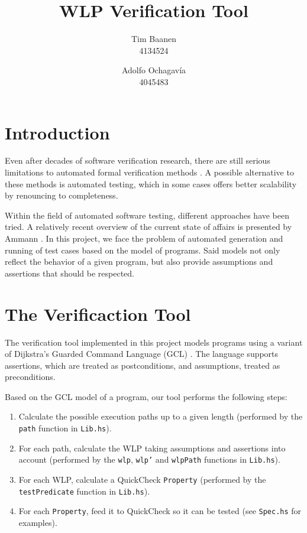 \documentclass[a4paper]{article}
\author{
  Tim Baanen\\4134524
  \and
  Adolfo Ochagavía\\4045483
}
\title{WLP Verification Tool}
\begin{document}
\maketitle

\section{Introduction}

Even after decades of software verification research, there are still serious
limitations to automated formal verification methods \cite{d2008survey}. A
possible alternative to these methods is automated testing, which in some cases
offers better scalability by renouncing to completeness.

Within the field of automated software testing, different approaches have been
tried. A relatively recent overview of the current state of affairs is
presented by Ammann \cite{ammann2008introduction}. In this project, we face
the problem of automated generation and running of test cases based on the
model of programs. Said models not only reflect the behavior of a given
program, but also provide assumptions and assertions that should be respected.


\section{The Verificaction Tool}

The verification tool implemented in this project models programs using a
variant of Dijkstra's Guarded Command Language (GCL) \cite{Dijkstra:gcl}.
The language supports assertions, which are treated as postconditions,
and assumptions, treated as preconditions.

Based on the GCL model of a program, our tool performs the following steps:

\begin{enumerate}
\item Calculate the possible execution paths up to a given length (performed by
the \texttt{path} function in \texttt{Lib.hs}).
\item For each path, calculate the WLP taking assumptions and assertions into account
(performed by the \texttt{wlp}, \texttt{wlp'} and \texttt{wlpPath} functions in \texttt{Lib.hs}).
\item For each WLP, calculate a QuickCheck \cite{claessen2011quickcheck} \texttt{Property}
(performed by the \texttt{testPredicate} function in \texttt{Lib.hs}).
\item For each \texttt{Property}, feed it to QuickCheck so it can be tested (see
\texttt{Spec.hs} for examples).
\end{enumerate}
\end{document}
